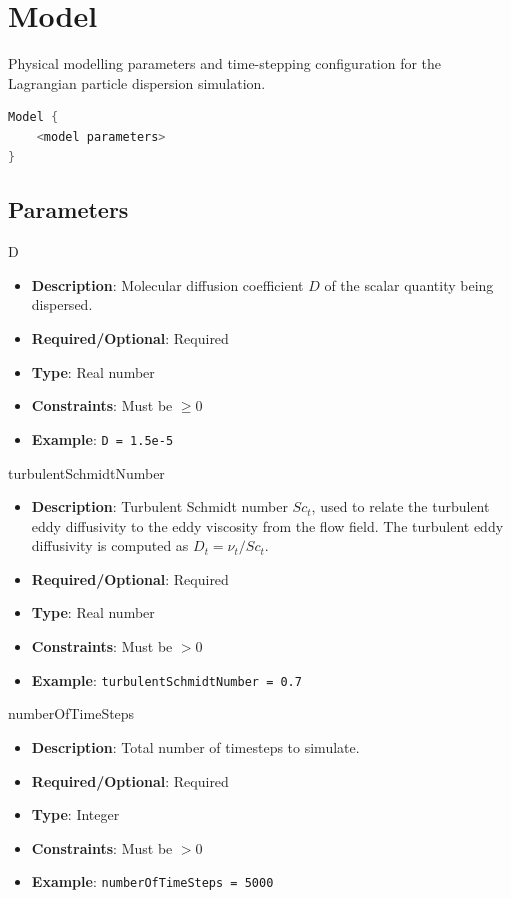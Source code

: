 \section{Model}

Physical modelling parameters and time-stepping configuration for the Lagrangian particle dispersion simulation.

\begin{lstlisting}[language=C++]
Model {
    <model parameters>
}
\end{lstlisting}

\subsection*{Parameters}

D
\vspace{\the\parameterListSpacing}
\begin{itemize}
    \item {\bf Description}: Molecular diffusion coefficient $D$ of the scalar quantity being dispersed.
    \item {\bf Required/Optional}: Required
    \item {\bf Type}: Real number
    \item {\bf Constraints}: Must be $\geq 0$
    \item {\bf Example}: \lstinline!D = 1.5e-5!
\end{itemize}

turbulentSchmidtNumber
\vspace{\the\parameterListSpacing}
\begin{itemize}
    \item {\bf Description}: Turbulent Schmidt number $Sc_t$, used to relate the turbulent eddy diffusivity to the eddy viscosity from the flow field. The turbulent eddy diffusivity is computed as $D_t = \nu_t / Sc_t$.
    \item {\bf Required/Optional}: Required
    \item {\bf Type}: Real number
    \item {\bf Constraints}: Must be $> 0$
    \item {\bf Example}: \lstinline!turbulentSchmidtNumber = 0.7!
\end{itemize}

numberOfTimeSteps
\vspace{\the\parameterListSpacing}
\begin{itemize}
    \item {\bf Description}: Total number of timesteps to simulate.
    \item {\bf Required/Optional}: Required
    \item {\bf Type}: Integer
    \item {\bf Constraints}: Must be $> 0$
    \item {\bf Example}: \lstinline!numberOfTimeSteps = 5000!
\end{itemize}

